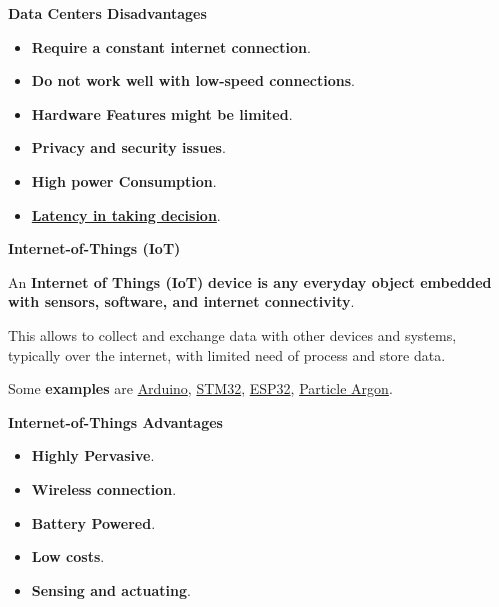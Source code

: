\documentclass[a4paper]{article}
\newcommand{\definition}[1]{\textcolor{Red3}{\textbf{#1}}\index{#1}}
\newcommand{\example}[1]{\textcolor{Green4}{\textbf{#1}}}
\newcommand{\highspace}{\vspace{1.2em}\noindent}
\begin{document}
    \begin{flushleft}
        \textcolor{Red2}{ \textbf{Data Centers Disadvantages}}
    \end{flushleft}
    \begin{itemize}
        \item \textbf{Require a constant internet connection}.
        \item \textbf{Do not work well with low-speed connections}.
        \item \textbf{Hardware Features might be limited}.
        \item \textbf{Privacy and security issues}.
        \item \textbf{High power Consumption}.
        \item \textbf{\underline{Latency in taking decision}}.
    \end{itemize}

    \newpage

    \begin{center}
        \large
        \textcolor{Red3}{\textbf{Internet-of-Things (IoT)}}
    \end{center}

    \noindent
    An \definition{Internet of Things (IoT)} \textbf{device is any everyday object embedded with sensors, software, and internet connectivity}.

    \highspace
    This allows to collect and exchange data with other devices and systems, typically over the internet, with limited need of process and store data.

    \highspace
    Some \example{examples} are \href{https://www.arduino.cc/}{Arduino}, \href{https://www.st.com/en/microcontrollers-microprocessors/stm32-32-bit-arm-cortex-mcus.html}{STM32}, \href{https://en.wikipedia.org/wiki/ESP32}{ESP32}, \href{https://docs.particle.io/argon/}{Particle Argon}.

    \begin{flushleft}
        \textcolor{Green3}{ \textbf{Internet-of-Things Advantages}}
    \end{flushleft}
    \begin{itemize}
        \item \textbf{Highly Pervasive}.
        \item \textbf{Wireless connection}.
        \item \textbf{Battery Powered}.
        \item \textbf{Low costs}.
        \item \textbf{Sensing and actuating}.
    \end{itemize}
\end{document}
